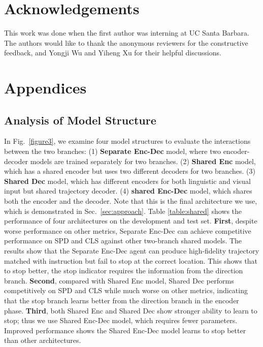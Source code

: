\documentclass[11pt,a4paper]{article}
\begin{document}
\section*{Acknowledgements}
This work was done when the first author was interning at UC Santa Barbara.
The authors would like to thank the anonymous reviewers for the constructive feedback, and Yongji Wu and Yiheng Xu for their helpful discussions.




\clearpage


\appendix

\section{Appendices}

\subsection{Analysis of Model Structure}

In Fig.~\ref{figure3}, we examine four model structures to evaluate the interactions between the two branches: (1) \textbf{Separate Enc-Dec} model, where two encoder-decoder models are trained separately for two branches. (2) \textbf{Shared Enc} model, which has a shared encoder but uses two different decoders for two branches. (3) \textbf{Shared Dec} model, which has different encoders for both linguistic and visual input but shared trajectory decoder. (4) \textbf{shared Enc-Dec} model, which shares both the encoder and the decoder. Note that this is the final architecture we use, which is demonstrated in Sec.~\ref{sec:approach}. Table \ref{table:shared} shows the performance of four architectures on the development and test set. \textbf{First}, despite worse performance on other metrics, Separate Enc-Dec can achieve competitive performance on SPD and CLS against other two-branch shared models. The results show that the Separate Enc-Dec agent can produce high-fidelity trajectory matched with instruction but fail to stop at the correct location. This shows that to stop better, the stop indicator requires the information from the direction branch. \textbf{Second}, compared with Shared Enc model, Shared Dec performs competitively on SPD and CLS while much worse on other metrics, indicating that the stop branch learns better from the direction branch in the encoder phase. \textbf{Third}, both Shared Enc and Shared Dec show stronger ability to learn to stop; thus we use Shared Enc-Dec model, which requires fewer parameters. Improved performance shows the Shared Enc-Dec model learns to stop better than other architectures.
\end{document}
